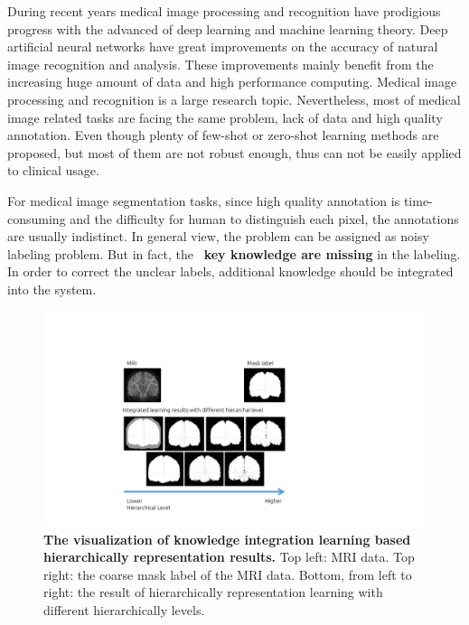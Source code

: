 \documentclass[10pt,twocolumn,letterpaper]{article}
\begin{document}
During recent years medical image processing and recognition have prodigious progress with the advanced of deep learning and machine learning theory. 
Deep artificial neural networks have great improvements on the accuracy of natural image recognition and analysis. These improvements mainly benefit from the increasing huge amount of data and high performance computing. 
Medical image processing and recognition is a large research topic. 
Nevertheless, most of medical image related tasks are facing the same problem, lack of data and high quality annotation. 
Even though plenty of few-shot or zero-shot learning methods are proposed, but most of them are not robust enough, thus can not be easily applied to clinical usage. 


For medical image segmentation tasks, since high quality annotation is time-consuming and the difficulty for human to distinguish each pixel, the annotations are usually indistinct. 
In general view, the problem can be assigned as noisy labeling problem. 
But in fact, the ~\textbf{key knowledge are missing} in the labeling. 
In order to correct the unclear labels, additional knowledge should be integrated into the system. 

\begin{figure}[t]
  \centering
   \includegraphics[width=1\linewidth]{./figs/first.pdf}
   \caption{\textbf{The visualization of knowledge integration learning based hierarchically representation results.} 
   Top left: MRI data. Top right: the coarse mask label of the MRI data. Bottom, from left to right: the result of hierarchically representation learning with different hierarchically levels. }
   \label{fig:first}
\end{figure}
\end{document}
